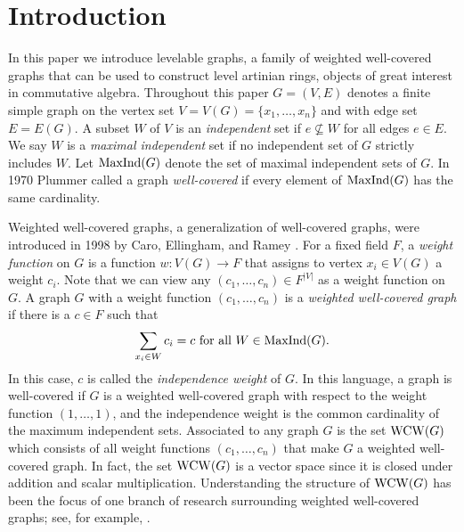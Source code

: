 \documentclass[12pt]{amsart}
\numberwithin{equation}{section}
\theoremstyle{definition}
\newcounter{i} %
\begin{document}
\maketitle


\section{Introduction}

In this paper we introduce levelable graphs, a family of 
weighted well-covered graphs
that can be used to construct  level artinian rings, objects 
of great interest in commutative algebra.   
Throughout this paper $G = (V,E)$ denotes a finite simple graph on the 
vertex set $V = V(G) = \{x_1,\ldots,x_n\}$ and with edge set $E=E(G)$. 
A subset $W$ of $V$ is an {\it independent} set if 
$e \not\subseteq W$ for all edges $e \in E$. We say $W$ is a {\it maximal 
independent} set if no independent set of $G$ strictly includes $W$.  Let ${\rm MaxInd}(G)$ denote
the set of maximal independent sets of $G$.
In 1970 Plummer \cite{P1970} called a
graph {\it well-covered}
if every element of ${\rm MaxInd}(G)$ has the same cardinality. 

Weighted well-covered graphs, a generalization
of well-covered graphs, were introduced in 1998 by 
Caro, Ellingham, and Ramey \cite{CER1998}.  For a fixed
field $F$, a {\it weight function} on $G$ is a
function $w:V(G) \rightarrow F$ that assigns to vertex
$x_i \in V(G)$ a weight $c_i$.  Note that we can
view any $(c_1,\ldots,c_n) \in F^{|V|}$ as a weight
function on $G$.  A graph $G$ with a weight function
$(c_1,\ldots,c_n)$ is a {\it weighted well-covered graph} if
there is a $c\in F$ such that 
\[
\sum_{x_i \in  W} c_i = c 
~\mbox{for all $W \in {\rm MaxInd}(G)$}.
\]
In this case, $c$ is called the {\it independence weight}
of $G$.
In this language, a graph is well-covered if $G$ 
is a weighted well-covered graph with respect to the weight
function $(1,\ldots,1)$, and the independence
weight is the common cardinality of the 
maximum independent sets. 
Associated to
any graph $G$ is the set ${\rm WCW}(G)$ which consists
of all weight functions $(c_1,\ldots,c_n)$ that make
$G$ a weighted well-covered graph. In fact, the set ${\rm WCW}(G)$ is a vector space since 
it is closed under addition
and scalar multiplication.
Understanding the 
structure of ${\rm WCW}(G)$ has
been the focus of one branch of research surrounding weighted
well-covered graphs; see, for example, \cite{BKMUV2014,BN2005,BN2007,CER1998,LT2011,LT2015,LT2015a,T2022}.
\end{document}
